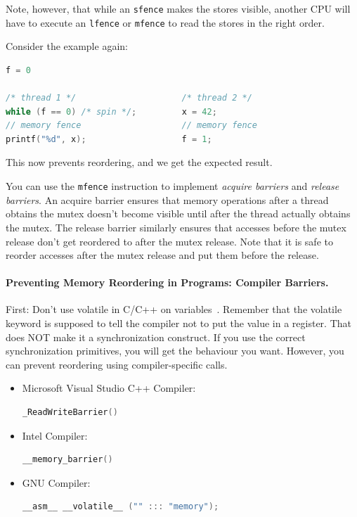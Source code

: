 \documentclass[a4paper]{report}
\begin{document}
Note, however, that while an {\tt sfence} makes the stores visible,
another CPU will have to execute an {\tt lfence} or {\tt mfence} to
read the stores in the right order.

\pagebreak
Consider the example again:
  \begin{lstlisting}[language=C]
                         f = 0

/* thread 1 */                     /* thread 2 */
while (f == 0) /* spin */;         x = 42;
// memory fence                    // memory fence
printf("%d", x);                   f = 1;
  \end{lstlisting}
This now prevents reordering, and we get the expected result.

You can use the {\tt mfence} instruction to implement \emph{acquire
  barriers} and \emph{release barriers}.  An acquire barrier ensures
that memory operations after a thread obtains the mutex doesn't become
visible until after the thread actually obtains the mutex.
The release barrier similarly ensures that accesses before the mutex
release don't get reordered to after the mutex release. Note that
it is safe to reorder accesses after the mutex release and put them
before the release.

\paragraph{Preventing Memory Reordering in Programs: Compiler Barriers.}
First: Don't use volatile in C/C++ on variables~\cite{so:volatile}. Remember that the volatile keyword is supposed to tell the compiler not to put the value in a register. That does NOT make it a synchronization construct. If you use the correct synchronization primitives, you will get the behaviour you want. However, you can prevent reordering using compiler-specific calls.

\begin{itemize}
  \item Microsoft Visual Studio C++ Compiler:
  \begin{lstlisting}[language=C]
_ReadWriteBarrier()
  \end{lstlisting}
  \item Intel Compiler:
  \begin{lstlisting}[language=C]
    __memory_barrier()
  \end{lstlisting}
  \item GNU Compiler:
  \begin{lstlisting}[language=C]
__asm__ __volatile__ ("" ::: "memory");
  \end{lstlisting}
\end{itemize}
\end{document}
